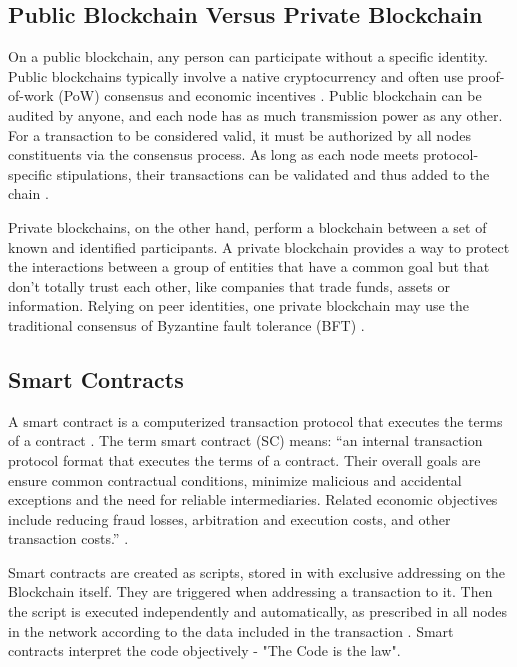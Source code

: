 
\subsection{Public Blockchain Versus Private Blockchain}\label{sec:versus}
On a public blockchain, any person can participate without a specific identity. Public blockchains typically involve a native cryptocurrency and often use proof-of-work (PoW) consensus and economic incentives \cite{androulaki2018hyperledger}. Public blockchain can be audited by anyone, and each node has as much transmission power as any other. For a transaction to be considered valid, it must be authorized by all nodes constituents via the consensus process. As long as each node meets protocol-specific stipulations, their transactions can be validated and thus added to the chain \cite{greve2018blockchain}.

Private blockchains, on the other hand, perform a blockchain between a set of known and identified participants. A private blockchain provides a way to protect the interactions between a group of entities that have a common goal but that don't totally trust each other, like companies that trade funds, assets or information. Relying on peer identities, one private blockchain may use the traditional consensus of Byzantine fault tolerance (BFT) \cite{androulaki2018hyperledger}.

\subsection{Smart Contracts}\label{sec:smartContracts}
A smart contract is a computerized transaction protocol that executes the terms of a contract \cite{szabo1997idea}. The term smart contract (SC) means: “an internal transaction protocol format that executes the terms of a contract. Their overall goals are ensure common contractual conditions, minimize malicious and accidental exceptions and the need for reliable intermediaries. Related economic objectives include reducing fraud losses, arbitration and execution costs, and other transaction costs.” \cite{szabo1997idea}.

Smart contracts are created as scripts, stored in with exclusive addressing on the Blockchain itself. They are triggered when addressing a transaction to it. Then the script is executed independently and automatically, as prescribed in all nodes in the network according to the data included in the transaction \cite{greve2018blockchain}. Smart contracts interpret the code objectively - "The Code is the law".




